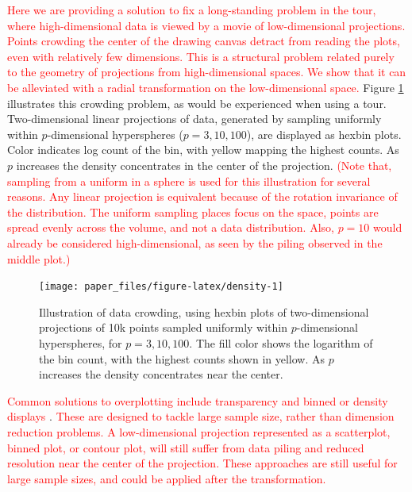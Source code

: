 \documentclass[]{interact}
\theoremstyle{plain}%
\theoremstyle{definition}
\theoremstyle{remark}
\begin{document}
\textcolor{red}{Here we are providing a solution to fix a long-standing problem in the tour, where high-dimensional data is viewed by a movie of low-dimensional projections. Points crowding the center of the drawing canvas detract from reading the plots, even with relatively few dimensions. This is a structural problem related purely to the geometry of projections from high-dimensional spaces. We show that it can be alleviated with a radial transformation on the low-dimensional space.}
Figure \ref{fig:density} illustrates this crowding problem, as would be
experienced when using a tour. Two-dimensional linear projections of
data, generated by sampling uniformly within \(p\)-dimensional
hyperspheres (\(p=3, 10, 100\)), are displayed as hexbin plots. Color
indicates log count of the bin, with yellow mapping the highest counts.
As \(p\) increases the density concentrates in the center of the
projection.
\textcolor{red}{(Note that, sampling from a uniform in a sphere is used for this illustration for several reasons. Any linear projection is equivalent because of the rotation invariance of the distribution. The uniform sampling places focus on the space, points are spread evenly across the volume, and not a data distribution. Also, $p=10$ would already be considered high-dimensional, as seen by the piling observed in the middle plot.)}

\begin{figure}

{\centering \texttt{[image: paper\_files/figure-latex/density-1]} 

}

\caption{Illustration of data crowding, using hexbin plots of two-dimensional projections of 10k points sampled uniformly within $p$-dimensional hyperspheres, for $p=3, 10, 100$. The fill color shows the logarithm of the bin count, with the highest counts shown in yellow. As $p$ increases the density  concentrates near the center.}\label{fig:density}
\end{figure}

\textcolor{red}{Common solutions to overplotting include transparency and binned or density displays}
\citep{chang}.
\textcolor{red}{These are designed to tackle large sample size, rather than dimension reduction problems. A low-dimensional projection represented as a scatterplot, binned plot, or contour plot, will still suffer from data piling and reduced resolution near the center of the projection. These approaches are still useful for large sample sizes, and could be applied after the transformation.}
\end{document}
